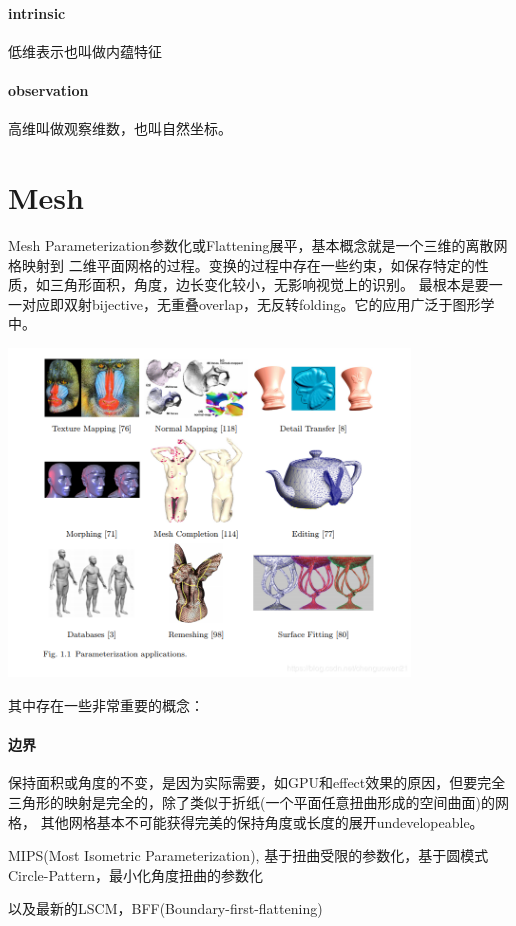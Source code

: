 \paragraph{intrinsic}
低维表示也叫做内蕴特征

\paragraph{observation}
高维叫做观察维数，也叫自然坐标。


\section{Mesh}
Mesh Parameterization参数化或Flattening展平，基本概念就是一个三维的离散网格映射到
二维平面网格的过程。变换的过程中存在一些约束，如保存特定的性质，如三角形面积，角度，边长变化较小，无影响视觉上的识别。
最根本是要一一对应即双射bijective，无重叠overlap，无反转folding。它的应用广泛于图形学中。

\begin{center}
    \includegraphics[width=0.8\textwidth]{images/mesh_parameterization_applications.png}
\end{center}

其中存在一些非常重要的概念：
\paragraph{边界}
保持面积或角度的不变，是因为实际需要，如GPU和effect效果的原因，但要完全三角形的映射是完全的，除了类似于折纸(一个平面任意扭曲形成的空间曲面)的网格，
其他网格基本不可能获得完美的保持角度或长度的展开undevelopeable。 

MIPS(Most Isometric Parameterization), 基于扭曲受限的参数化，基于圆模式Circle-Pattern，最小化角度扭曲的参数化

以及最新的LSCM，BFF(Boundary-first-flattening)
